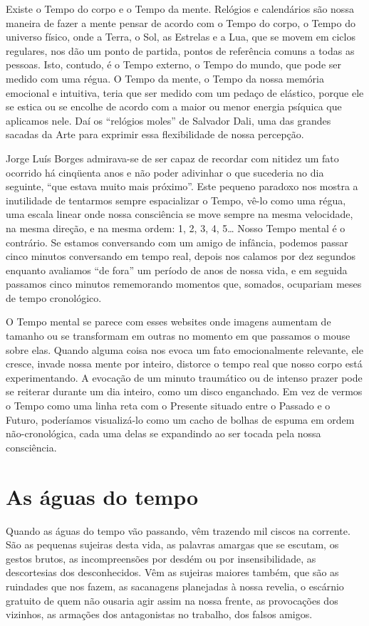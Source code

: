 Existe o Tempo do corpo e o Tempo da mente. Relógios e calendários são
nossa maneira de fazer a mente pensar de acordo com o Tempo do corpo,
o Tempo do universo físico, onde a Terra, o Sol, as Estrelas e a Lua,
que se movem em ciclos regulares, nos dão um ponto de partida, pontos
de referência comuns a todas as pessoas.  Isto, contudo, é o Tempo
externo, o Tempo do mundo, que pode ser medido com uma régua. O Tempo
da mente, o Tempo da nossa memória emocional e intuitiva, teria que
ser medido com um pedaço de elástico, porque ele se estica ou se
encolhe de acordo com a maior ou menor energia psíquica que aplicamos
nele. Daí os “relógios moles” de Salvador Dali, uma das grandes
sacadas da Arte para exprimir essa flexibilidade de nossa percepção.

Jorge Luís Borges admirava-se de ser capaz de recordar com nitidez um
fato ocorrido há cinqüenta anos e não poder adivinhar o que sucederia
no dia seguinte, “que estava muito mais próximo”.  Este pequeno
paradoxo nos mostra a inutilidade de tentarmos sempre espacializar o
Tempo, vê-lo como uma régua, uma escala linear onde nossa consciência
se move sempre na mesma velocidade, na mesma direção, e na mesma
ordem: 1, 2, 3, 4, 5…  Nosso Tempo mental é o contrário. Se estamos
conversando com um amigo de infância, podemos passar cinco minutos
conversando em tempo real, depois nos calamos por dez segundos
enquanto avaliamos “de fora” um período de anos de nossa vida, e em
seguida passamos cinco minutos rememorando momentos que, somados,
ocupariam meses de tempo cronológico.

O Tempo mental se parece com esses websites onde imagens aumentam de
tamanho ou se transformam em outras no momento em que passamos o
mouse sobre elas.  Quando alguma coisa nos evoca um fato
emocionalmente relevante, ele cresce, invade nossa mente por inteiro,
distorce o tempo real que nosso corpo está experimentando. A evocação
de um minuto traumático ou de intenso prazer pode se reiterar durante
um dia inteiro, como um disco enganchado.  Em vez de vermos o Tempo
como uma linha reta com o Presente situado entre o Passado e o
Futuro, poderíamos visualizá-lo como um cacho de bolhas de espuma em
ordem não-cronológica, cada uma delas se expandindo ao ser tocada
pela nossa consciência.

\chapter{As águas do tempo}

Quando as águas do tempo vão passando, vêm trazendo mil ciscos na
corrente. São as pequenas sujeiras desta vida, as palavras amargas
que se escutam, os gestos brutos, as incompreensões por desdém ou por
insensibilidade, as descortesias dos desconhecidos. Vêm as sujeiras
maiores também, que são as ruindades que nos fazem, as sacanagens
planejadas à nossa revelia, o escárnio gratuito de quem não ousaria
agir assim na nossa frente, as provocações dos vizinhos, as armações
dos antagonistas no trabalho, dos falsos amigos.

